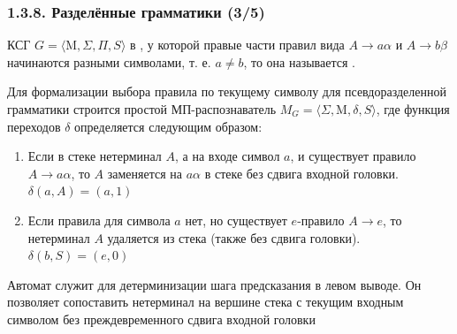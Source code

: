 \begin{frame}
\frametitle{1.3.8. Разделённые грамматики (3/5)}

КСГ $G=\langle \mathrm{M}, \Sigma, \Pi, S \rangle$ в  , у которой правые части правил вида \( A \to a\alpha \) и \( A \to b\beta \) начинаются разными символами, т. е. \( a \neq b \), то она называется .

Для формализации выбора правила по текущему символу для псевдоразделенной грамматики строится простой МП-распознаватель \( M_G = \langle \Sigma, \mathrm{M}, \delta, S \rangle \), где функция переходов \( \delta \) определяется следующим образом:
\begin{enumerate}
  \item Если в стеке нетерминал \( A \), а на входе символ \( a \), и существует правило \( A \to a\alpha \), то \( A \) заменяется на \( a\alpha \) в стеке без сдвига входной головки. \(\delta(a, A) = (a, 1)\)
  \item Если правила для символа \( a \) нет, но существует \( e \)-правило \( A \to e \), то нетерминал \( A \) удаляется из стека (также без сдвига головки). \(\delta(b, S) = (e, 0)\)
\end{enumerate}
Автомат служит для детерминизации шага предсказания в левом выводе. Он позволяет сопоставить нетерминал на вершине стека с текущим входным символом без преждевременного сдвига входной головки
\end{frame}


